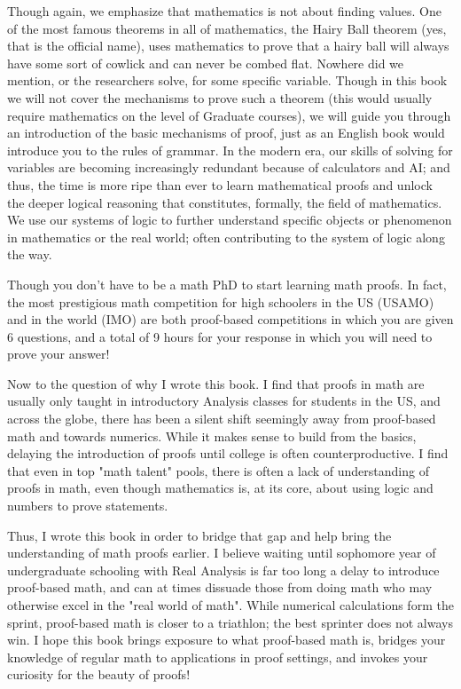Though again, we emphasize that mathematics is not about finding values. One of the most famous theorems in all of mathematics, the Hairy Ball theorem (yes, that is the official name), uses mathematics to prove that a hairy ball will always have some sort of cowlick and can never be combed flat. Nowhere did we mention, or the researchers solve, for some specific variable. Though in this book we will not cover the mechanisms to prove such a theorem (this would usually require mathematics on the level of Graduate courses), we will guide you through an introduction of the basic mechanisms of proof, just as an English book would introduce you to the rules of grammar. In the modern era, our skills of solving for variables are becoming increasingly redundant because of calculators and AI; and thus, the time is more ripe than ever to learn mathematical proofs and unlock the deeper logical reasoning that constitutes, formally, the field of mathematics. We use our systems of logic to further understand specific objects or phenomenon in mathematics or the real world; often contributing to the system of logic along the way. 

Though you don't have to be a math PhD to start learning math proofs. In fact, the most prestigious math competition for high schoolers in the US (USAMO) and in the world (IMO) are both proof-based competitions in which you are given 6 questions, and a total of 9 hours for your response in which you will need to prove your answer!

Now to the question of why I wrote this book. I find that proofs in math are usually only taught in introductory Analysis classes for students in the US, and across the globe, there has been a silent shift seemingly away from proof-based math and towards numerics. While it makes sense to build from the basics, delaying the introduction of proofs until college is often counterproductive. I find that even in top "math talent" pools, there is often a lack of understanding of proofs in math, even though mathematics is, at its core, about using logic and numbers to prove statements. 

Thus, I wrote this book in order to bridge that gap and help bring the understanding of math proofs earlier. I believe waiting until sophomore year of undergraduate schooling with Real Analysis is far too long a delay to introduce proof-based math, and can at times dissuade those from doing math who may otherwise excel in the "real world of math". While numerical calculations form the sprint, proof-based math is closer to a triathlon; the best sprinter does not always win. I hope this book brings exposure to what proof-based math is, bridges your knowledge of regular math to applications in proof settings, and invokes your curiosity for the beauty of proofs! 

